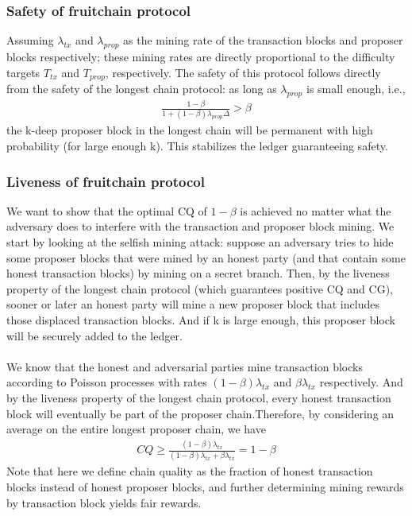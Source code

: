 \subsubsection{Safety of fruitchain protocol}
Assuming $\lambda_{tx}$ and $\lambda_{prop}$ as the mining rate of the transaction blocks and proposer blocks respectively;
these mining rates are directly proportional to the difficulty targets $T_{tx}$ and $T_{prop}$, respectively.
The safety of this protocol follows directly from the safety of the longest chain protocol: as long as
$\lambda_{prop}$ is small enough, i.e.,
\begin{align*}
	\frac{1-\beta}{1+(1-\beta)\lambda_{prop}\Delta} > \beta
\end{align*}
the k-deep proposer block in the longest chain will be permanent with high probability (for large
enough k). This stabilizes the ledger guaranteeing safety.
\subsubsection{Liveness of fruitchain protocol}
We want to show that the optimal CQ of $1 − \beta$ is achieved no matter what the adversary does to interfere with the transaction and proposer block mining. We start by looking at the selfish mining attack: suppose an adversary tries to hide some proposer blocks that were mined by an honest party (and that contain some honest transaction blocks) by mining on a secret branch. Then, by the liveness property of the longest chain protocol (which guarantees positive CQ and CG), sooner or later an honest party will mine a new proposer block that includes those displaced transaction blocks. And if k is large enough, this proposer block will be securely added to the ledger.\\\\
We know that the honest and adversarial parties mine transaction blocks according to Poisson processes with rates $(1 − \beta)\lambda_{tx}$ and $\beta\lambda_{tx}$ respectively. And by the liveness property of the longest chain protocol, every honest transaction block will eventually be part of the proposer chain.Therefore, by considering an average on the entire longest proposer chain, we have
\begin{align*}
	CQ \ge \frac{(1-\beta)\lambda_{tx}}{(1-\beta)\lambda_{tx} + \beta\lambda_{tx}} = 1 - \beta
\end{align*}
Note that here we define chain quality as the fraction of honest transaction blocks instead of honest proposer blocks, and further determining mining rewards by transaction block yields fair rewards.

